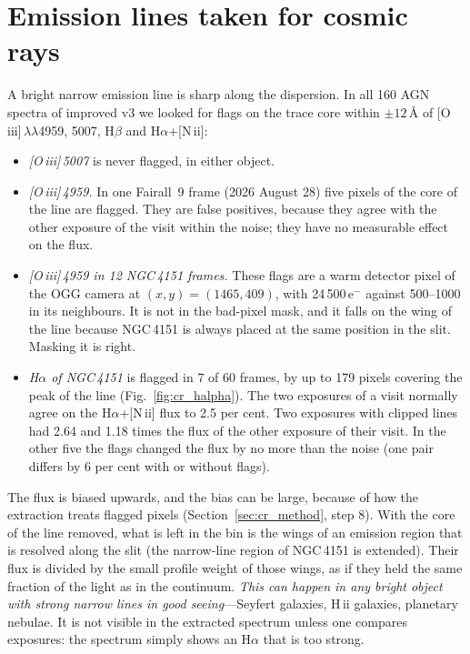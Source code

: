 \section{Emission lines taken for cosmic rays}
\label{sec:cr_lines}
A bright narrow emission line is sharp along the dispersion. In all 160 AGN spectra of improved v3 we looked for flags
on the trace core within $\pm12$\,\AA{} of [O\,{\sc iii}]\,$\lambda\lambda$4959, 5007, H$\beta$ and
H$\alpha$+[N\,{\sc ii}]:
\begin{itemize}
\item \textit{[O\,{\sc iii}]\,5007} is never flagged, in either object.
\item \textit{[O\,{\sc iii}]\,4959.} In one Fairall~9 frame (2026 August 28) five pixels of the core of the line are
flagged. They are false positives, because they agree with the other exposure of the visit within the noise; they have no
measurable effect on the flux.
\item \textit{[O\,{\sc iii}]\,4959 in 12 NGC\,4151 frames.} These flags are a warm detector pixel of the OGG camera at
$(x,y)=(1465,409)$, with 24\,500\,e$^-$ against 500--1000 in its neighbours. It is not in the bad-pixel mask, and it
falls on the wing of the line because NGC\,4151 is always placed at the same position in the slit. Masking it is right.
\item \textit{H$\alpha$ of NGC\,4151} is flagged in 7 of 60 frames, by up to 179 pixels covering the peak of the line
(Fig.~\ref{fig:cr_halpha}). The two exposures of a visit normally agree on the H$\alpha$+[N\,{\sc ii}] flux to 2.5 per
cent. Two exposures with clipped lines had 2.64 and 1.18 times the flux of the other exposure of their visit. In the
other five the flags changed the flux by no more than the noise (one pair differs by 6 per cent with or without flags).
\end{itemize}
The flux is biased upwards, and the bias can be large, because of how the extraction treats flagged pixels
(Section~\ref{sec:cr_method}, step 8). With the core of the line removed, what is left in the bin is the wings of an
emission region that is resolved along the slit (the narrow-line region of NGC\,4151 is extended). Their flux is divided
by the small profile weight of those wings, as if they held the same fraction of the light as in the continuum.
\textit{This can happen in any bright object with strong narrow lines in good seeing}---Seyfert galaxies, H\,{\sc ii}
galaxies, planetary nebulae. It is not visible in the extracted spectrum unless one compares exposures: the spectrum
simply shows an H$\alpha$ that is too strong.

